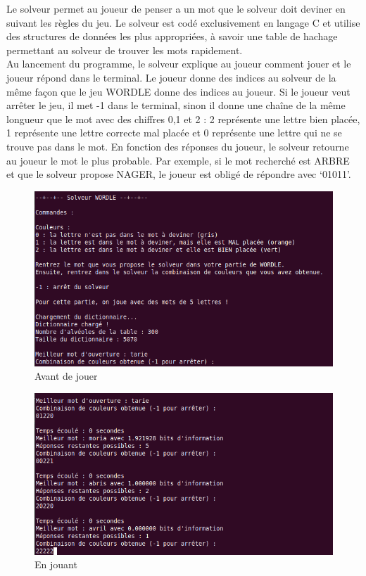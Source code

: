 \tabto{1cm}Le solveur permet au joueur de penser a un mot que le solveur doit deviner en suivant les règles du jeu. Le solveur est codé exclusivement en langage C et utilise des structures de données les plus appropriées, à savoir une table de hachage permettant au solveur de trouver les mots rapidement. \\

\tabto{1cm}Au lancement du programme, le solveur explique au joueur comment jouer et le joueur répond dans le terminal. Le joueur donne des indices au solveur de la même façon que le jeu WORDLE donne des indices au joueur. Si le joueur veut arrêter le jeu, il met -1 dans le terminal, sinon il donne une chaîne de la même longueur que le mot avec des chiffres 0,1 et 2 : 2 représente une lettre bien placée, 1 représente une lettre correcte mal placée et 0 représente une lettre qui ne se trouve pas dans le mot. En fonction des réponses du joueur, le solveur retourne au joueur le mot le plus probable. Par exemple, si le mot recherché est ARBRE et que le solveur propose NAGER, le joueur est obligé de répondre avec ‘01011’.

\begin{figure}[h!]
\centering
\includegraphics[width=12cm]{figures/avant.PNG}
\caption{Avant de jouer}
\end{figure}

\begin{figure}[h!]
\centering
\includegraphics[width=12cm]{figures/solveur_gagne.PNG}
\caption{En jouant}
\end{figure}